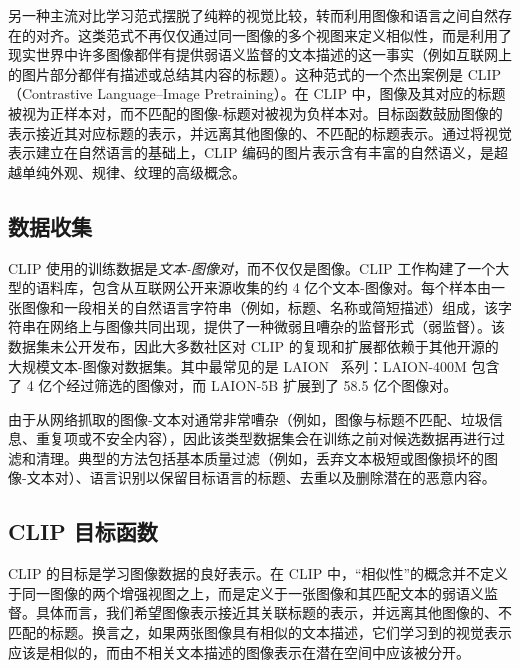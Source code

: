 \documentclass[../../book-main_zh.tex]{subfiles}
\begin{document}
另一种主流对比学习范式摆脱了纯粹的视觉比较，转而利用图像和语言之间自然存在的对齐。这类范式不再仅仅通过同一图像的多个视图来定义相似性，而是利用了现实世界中许多图像都伴有提供弱语义监督的文本描述的这一事实（例如互联网上的图片部分都伴有描述或总结其内容的标题）。这种范式的一个杰出案例是 CLIP（Contrastive Language–Image Pretraining）\citep{Radford2021-ir}。在 CLIP 中，图像及其对应的标题被视为正样本对，而不匹配的图像-标题对被视为负样本对。目标函数鼓励图像的表示接近其对应标题的表示，并远离其他图像的、不匹配的标题表示。通过将视觉表示建立在自然语言的基础上，CLIP 编码的图片表示含有丰富的自然语义，是超越单纯外观、规律、纹理的高级概念。

\subsection{数据收集}

CLIP 使用的训练数据是{\em 文本-图像对}，而不仅仅是图像。CLIP 工作构建了一个大型的语料库，包含从互联网公开来源收集的约 4 亿个文本-图像对。每个样本由一张图像和一段相关的自然语言字符串（例如，标题、名称或简短描述）组成，该字符串在网络上与图像共同出现，提供了一种微弱且嘈杂的监督形式（弱监督）。该数据集未公开发布，因此大多数社区对 CLIP 的复现和扩展都依赖于其他开源的大规模文本-图像对数据集。其中最常见的是 LAION~\citep{schuhmann2022laion5bopenlargescaledataset} 系列：LAION-400M 包含了 4 亿个经过筛选的图像对，而 LAION-5B 扩展到了 58.5 亿个图像对。

由于从网络抓取的图像-文本对通常非常嘈杂（例如，图像与标题不匹配、垃圾信息、重复项或不安全内容），因此该类型数据集会在训练之前对候选数据再进行过滤和清理。典型的方法包括基本质量过滤（例如，丢弃文本极短或图像损坏的图像-文本对）、语言识别以保留目标语言的标题、去重以及删除潜在的恶意内容。

\subsection{CLIP 目标函数}
CLIP 的目标是学习图像数据的良好表示。在 CLIP 中，“相似性”的概念并不定义于同一图像的两个增强视图之上，而是定义于一张图像和其匹配文本的弱语义监督。具体而言，我们希望图像表示接近其关联标题的表示，并远离其他图像的、不匹配的标题。换言之，如果两张图像具有相似的文本描述，它们学习到的视觉表示应该是相似的，而由不相关文本描述的图像表示在潜在空间中应该被分开。
\end{document}
